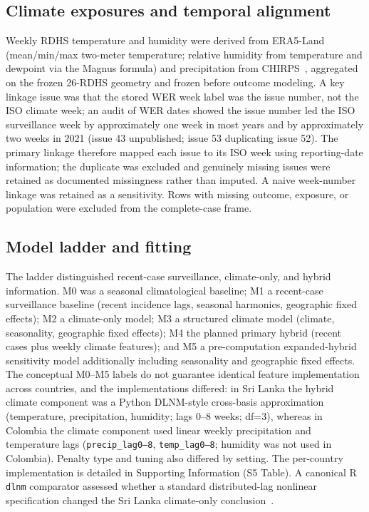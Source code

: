 \documentclass[11pt,a4paper]{article}
\begin{document}
\subsection{Climate exposures and temporal alignment}
Weekly RDHS temperature and humidity were derived from ERA5-Land~\cite{MunozSabater2021,ERA5LandCDS} (mean/min/max two-meter temperature; relative humidity from temperature and dewpoint via the Magnus formula) and precipitation from CHIRPS~\cite{Funk2015,CHIRPS}, aggregated on the frozen 26-RDHS geometry and frozen before outcome modeling. A key linkage issue was that the stored WER week label was the issue number, not the ISO climate week; an audit of WER dates showed the issue number led the ISO surveillance week by approximately one week in most years and by approximately two weeks in 2021 (issue 43 unpublished; issue 53 duplicating issue 52). The primary linkage therefore mapped each issue to its ISO week using reporting-date information; the duplicate was excluded and genuinely missing issues were retained as documented missingness rather than imputed. A naive week-number linkage was retained as a sensitivity. Rows with missing outcome, exposure, or population were excluded from the complete-case frame.

\subsection{Model ladder and fitting}
The ladder distinguished recent-case surveillance, climate-only, and hybrid information. M0 was a seasonal climatological baseline; M1 a recent-case surveillance baseline (recent incidence lags, seasonal harmonics, geographic fixed effects); M2 a climate-only model; M3 a structured climate model (climate, seasonality, geographic fixed effects); M4 the planned primary hybrid (recent cases plus weekly climate features); and M5 a pre-computation expanded-hybrid sensitivity model additionally including seasonality and geographic fixed effects. The conceptual M0--M5 labels do not guarantee identical feature implementation across countries, and the implementations differed: in Sri Lanka the hybrid climate component was a Python DLNM-style cross-basis approximation (temperature, precipitation, humidity; lags 0--8 weeks; df=3), whereas in Colombia the climate component used linear weekly precipitation and temperature lags (\texttt{precip\_lag0--8}, \texttt{temp\_lag0--8}; humidity was not used in Colombia). Penalty type and tuning also differed by setting. The per-country implementation is detailed in Supporting Information (S5 Table). A canonical R \texttt{dlnm} comparator assessed whether a standard distributed-lag nonlinear specification changed the Sri Lanka climate-only conclusion~\cite{Gasparrini2010,Gasparrini2011}.
\end{document}
